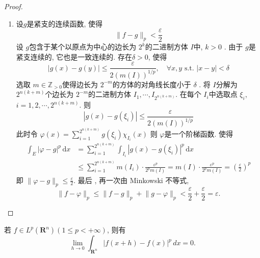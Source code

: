 \documentclass[../main.tex]{subfiles}
\begin{document}
\begin{proof}
\begin{enumerate}
        \item 设\(  g  \)是紧支的连续函数, 使得 \[
        \lVert f - g \rVert_{p} < \frac{ \varepsilon  }{2 }  
        \]  设 \(  g  \)包含于某个以原点为中心的边长为 \(  2^{k}  \)的二进制方体 \(  I  \)中, \(  k> 0  \) .    由于 \(  g  \)是紧支连续的, 它也是一致连续的. 存在\(   \delta > 0  \), 使得 \[
       \left| g\left( x \right)-g\left( y \right)   \right|\le \frac{ \varepsilon  }{2 (m(I))^{1/p}  } ,\quad \forall x,y \text{ s.t. } \left| x-y \right|<  \delta     
        \] 
        选取 \(  m \in \mathbb{Z} _{> 0}  \)使得边长为 \(  2^{-m}\)的方体的对角线长度小于 \(   \delta   \) .  
        将 \( I \)分解为 \(  2^{n(k+ m)}  \)个边长为 \(  2^{-m}  \)的二进制方体 \(  I_1,\cdots ,I_{2^{n(k+ m)}}  \). 在每个 \(  I_{i}  \)中选取点 \(   \xi _{i}  \), \(  i= 1,2,\cdots ,2^{n(k+ m)}  \). 则 \[
        \left| g\left( x \right)-g\left(  \xi _{i} \right)   \right|\le \frac{ \varepsilon  }{2 (m(I))^{1/p}  }
        \]   此时令 \(   \varphi \left( x \right)= \sum _{i= 1}^{2^{n(k+ m)}}g\left(  \xi _{i} \right)\chi _{I_{i}}\left( x \right)     \) 则 \(   \varphi   \)是一个阶梯函数. 使得\begin{equation}
            \begin{aligned}
                \int_{E}\left|  \varphi -g \right|^{p}\,\mathrm{d} x&= \sum _{i= 1}^{2^{n(k+ m)}}  \int_{I_i}\left| g\left( x \right)-g\left(  \xi _{i} \right)   \right|^{p}\,\mathrm{d} x\\ 
                 &\le \sum _{i= 1}^{2^{n(k+ m)}}m\left( I_{i} \right)  \cdot  \frac{ \varepsilon^p  }{2^p m\left( I \right)  }= m(I) \cdot \frac{\varepsilon^p}{2^p m(I)} = \left( \frac{ \varepsilon  }{2 } \right)^p
            \end{aligned}
        \end{equation} 
        即 \( \lVert \varphi - g \rVert_{p} \le \frac{\varepsilon}{2} \).
 最后 , 再一次由 Minkowski 不等式,  \[
 \lVert f - \varphi \rVert_{p} \le \lVert f - g \rVert_{p} + \lVert g - \varphi \rVert_{p} < \frac{\varepsilon}{2} + \frac{\varepsilon}{2} = \varepsilon.
 \]
    \end{enumerate}
    
\end{proof}

\begin{theorem}{}{}
若 $f \in L^{p}(\mathbf{R}^{n})(1 \leq p < +\infty)$, 则有
\[
\lim_{h \to 0} \int_{\mathbf{R}^{n}} \lvert f(x + h) - f(x) \rvert^{p} \, dx = 0.
\]
\end{theorem}
\end{document}
